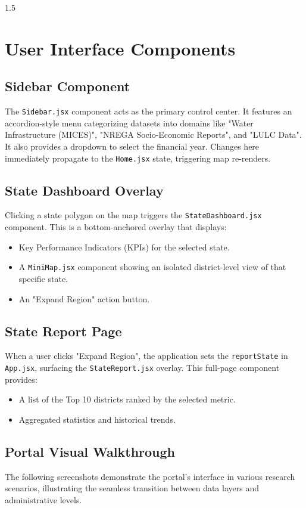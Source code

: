 \documentclass[12pt,a4paper]{report}
\begin{document}
\begin{spacing}{1.5}
\chapter{User Interface Components}

\section{Sidebar Component}
The \texttt{Sidebar.jsx} component acts as the primary control center. It features an accordion-style menu categorizing datasets into domains like "Water Infrastructure (MICES)", "NREGA Socio-Economic Reports", and "LULC Data". It also provides a dropdown to select the financial year. Changes here immediately propagate to the \texttt{Home.jsx} state, triggering map re-renders.

\section{State Dashboard Overlay}
Clicking a state polygon on the map triggers the \texttt{StateDashboard.jsx} component. This is a bottom-anchored overlay that displays:
\begin{itemize}
    \item Key Performance Indicators (KPIs) for the selected state.
    \item A \texttt{MiniMap.jsx} component showing an isolated district-level view of that specific state.
    \item An "Expand Region" action button.
\end{itemize}

\section{State Report Page}
When a user clicks "Expand Region", the application sets the \texttt{reportState} in \texttt{App.jsx}, surfacing the \texttt{StateReport.jsx} overlay. This full-page component provides:
\begin{itemize}
    \item A list of the Top 10 districts ranked by the selected metric.
    \item Aggregated statistics and historical trends.
\end{itemize}

\section{Portal Visual Walkthrough}
The following screenshots demonstrate the portal's interface in various research scenarios, illustrating the seamless transition between data layers and administrative levels.


\end{spacing}
\end{document}
